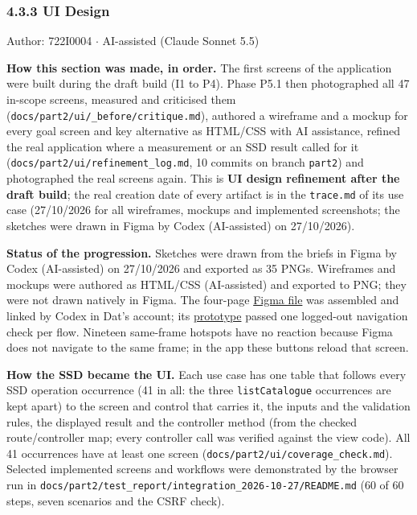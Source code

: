 \subsubsection*{4.3.3 UI Design}
Author: 722I0004 \ensuremath{\cdot} AI-assisted (Claude Sonnet 5.5)

\textbf{How this section was made, in order.} The first screens of the application were built during the draft build (I1 to P4). Phase P5.1 then photographed all 47 in-scope screens, measured and criticised them (\texttt{docs/\allowbreak{}part2/\allowbreak{}ui/\allowbreak{}\_\allowbreak{}before/\allowbreak{}critique.\allowbreak{}md}), authored a wireframe and a mockup for every goal screen and key alternative as HTML/CSS with AI assistance, refined the real application where a measurement or an SSD result called for it (\texttt{docs/\allowbreak{}part2/\allowbreak{}ui/\allowbreak{}refinement\_\allowbreak{}log.\allowbreak{}md}, 10 commits on branch \texttt{part2}) and photographed the real screens again. This is \textbf{UI design refinement after the draft build}; the real creation date of every artifact is in the \texttt{trace.\allowbreak{}md} of its use case (27/10/2026 for all wireframes, mockups and implemented screenshots; the sketches were drawn in Figma by Codex (AI-assisted) on 27/10/2026).

\textbf{Status of the progression.} Sketches were drawn from the briefs in Figma by Codex (AI-assisted) on 27/10/2026 and exported as 35 PNGs. Wireframes and mockups were authored as HTML/CSS (AI-assisted) and exported to PNG; they were not drawn natively in Figma. The four-page \href{\TargetFigmaFile}{Figma file} was assembled and linked by Codex in Dat's account; its \href{\TargetFigma}{prototype} passed one logged-out navigation check per flow. Nineteen same-frame hotspots have no reaction because Figma does not navigate to the same frame; in the app these buttons reload that screen.

\textbf{How the SSD became the UI.} Each use case has one table that follows every SSD operation occurrence (41 in all: the three \texttt{listCatalogue} occurrences are kept apart) to the screen and control that carries it, the inputs and the validation rules, the displayed result and the controller method (from the checked route/controller map; every controller call was verified against the view code). All 41 occurrences have at least one screen (\texttt{docs/\allowbreak{}part2/\allowbreak{}ui/\allowbreak{}coverage\_\allowbreak{}check.\allowbreak{}md}). Selected implemented screens and workflows were demonstrated by the browser run in \texttt{docs/\allowbreak{}part2/\allowbreak{}test\_\allowbreak{}report/\allowbreak{}integration\_\allowbreak{}2026-10-27/\allowbreak{}README.\allowbreak{}md} (60 of 60 steps, seven scenarios and the CSRF check).

